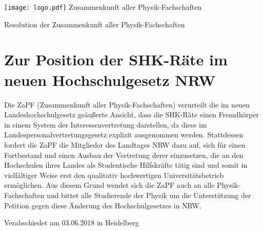 \documentclass[DIV=calc]{scrartcl}
\begin{document}
    \hspace{0.87\textwidth}
    \begin{minipage}{120pt}
        \vspace{-1.8cm}
        \texttt{[image: logo.pdf]}
        \centering
        \small Zusammenkunft aller Physik-Fachschaften
    \end{minipage}
    \begin{center}
        \huge{Resolution der Zusammenkunft aller Physik-Fachschaften}\vspace{.25\baselineskip}\\
        \normalsize
    \end{center}
    \vspace{1cm} 
    \section*{Zur Position der SHK-Räte im neuen Hochschulgesetz NRW}
Die ZaPF (Zusammenkunft aller Physik-Fachschaften) verurteilt die im neuen Landeshochschulgesetz
geäußerte Ansicht, dass die SHK-Räte einen Fremdkörper in einem System der Interessenvertretung darstellen, da diese im Landespersonalvertretungsgesetz explizit ausgenommen werden. Stattdessen fordert die ZaPF  die Mitglieder des Landtages
NRW dazu auf, sich für einen Fortbestand und einen Ausbau der Vertretung derer einzusetzen, die an den Hochschulen ihres
Landes als Studentische Hilfskräfte tätig sind und somit in vielfältiger Weise erst den qualitativ hochwertigen 
Universitätsbetrieb ermöglichen. Aus diesem Grund wendet sich die ZaPF auch an alle Physik-Fachschaften und bittet alle 
Studierende der Physik um die Unterstützung der Petition gegen diese Änderung des Hochschulgesetzes in NRW.
\vfill
    \begin{flushright}
        Verabschiedet am 03.06.2018 in Heidelberg
    \end{flushright}
\end{document}
